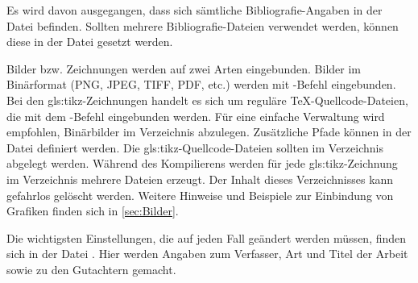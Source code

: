 Es wird davon ausgegangen, dass sich sämtliche Bibliografie-Angaben in der Datei
 befinden.
Sollten mehrere Bibliografie-Dateien verwendet werden, können diese in der Datei
 gesetzt werden.

Bilder bzw. Zeichnungen werden auf zwei Arten eingebunden.
Bilder im Binärformat (PNG, JPEG, TIFF, PDF, etc.)
werden mit -Befehl eingebunden. 
Bei den \gls{gls:tikz}-Zeichnungen handelt es sich um reguläre TeX-Quellcode-Dateien,
die mit dem \verb++-Befehl eingebunden werden.
Für eine einfache Verwaltung wird empfohlen, Binärbilder im Verzeichnis  abzulegen.
Zusätzliche Pfade können in der Datei  definiert werden.
Die \gls{gls:tikz}-Quellcode-Dateien sollten im Verzeichnis  abgelegt werden.
Während des Kompilierens werden für jede \gls{gls:tikz}-Zeichnung im Verzeichnis  mehrere Dateien erzeugt.
Der Inhalt dieses Verzeichnisses kann gefahrlos gelöscht werden.
Weitere Hinweise und Beispiele zur Einbindung von Grafiken finden sich in \cref{sec:Bilder}.

Die wichtigsten Einstellungen, die auf jeden Fall geändert werden müssen,
finden sich in der Datei .
Hier werden \ua Angaben zum Verfasser, Art und Titel der Arbeit sowie zu den Gutachtern gemacht.

